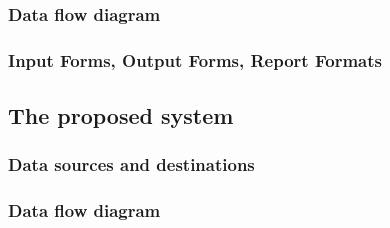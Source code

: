 %    


\subsubsection{Data flow diagram}

\subsubsection{Input Forms, Output Forms, Report Formats}

\subsection{The proposed system}

\subsubsection{Data sources and destinations}

\subsubsection{Data flow diagram}
